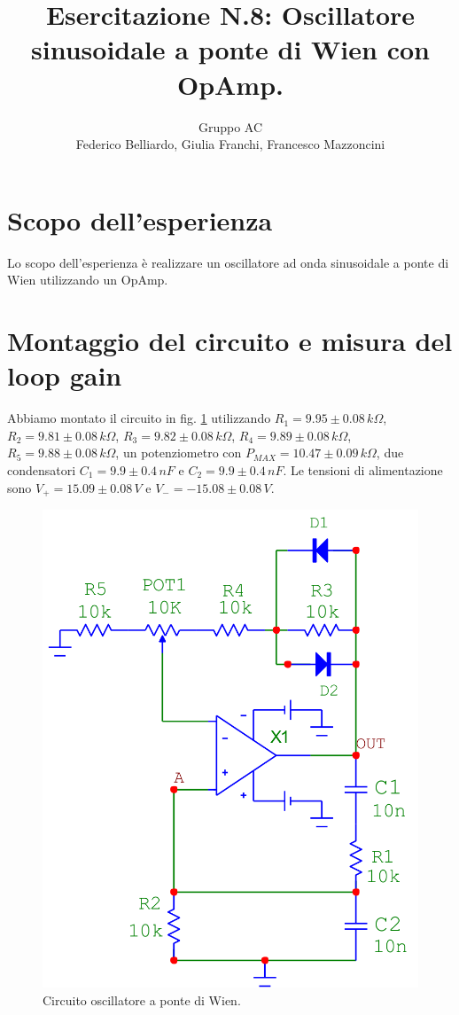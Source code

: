 \documentclass[10pt,a4paper]{article}
\author{Gruppo AC \\ Federico Belliardo, Giulia Franchi, Francesco Mazzoncini}
\title{Esercitazione N.8: Oscillatore sinusoidale a ponte di Wien con OpAmp.}
\begin{document}
\maketitle
\section{Scopo dell'esperienza}
Lo scopo dell'esperienza è realizzare un oscillatore ad onda sinusoidale a ponte di Wien utilizzando un OpAmp.\\
\section{Montaggio del circuito e misura del loop gain}
Abbiamo montato il circuito in fig. \ref{oscillatore} utilizzando $R_1=9.95\pm0.08\,k\Omega$, $R_2=9.81\pm0.08\,k\Omega$, $R_3=9.82\pm0.08\,k\Omega$, $R_4=9.89\pm0.08\,k\Omega$, $R_5=9.88\pm0.08\,k\Omega$, un potenziometro con $P_{MAX}=10.47\pm0.09\,k\Omega$, due condensatori $C_1=9.9\pm0.4\,nF$ e $C_2=9.9\pm0.4\,nF$. Le tensioni di alimentazione sono $V_{+} = 15.09 \pm 0.08 \, V$ e $V_{-} = -15.08 \pm 0.08 \, V$.

\begin{figure}[!htb]
  \centering
  \includegraphics[scale=0.25]{ponteDiWien.png}
\caption{Circuito oscillatore a ponte di Wien.}
\label{oscillatore}
\end{figure}
\end{document}
